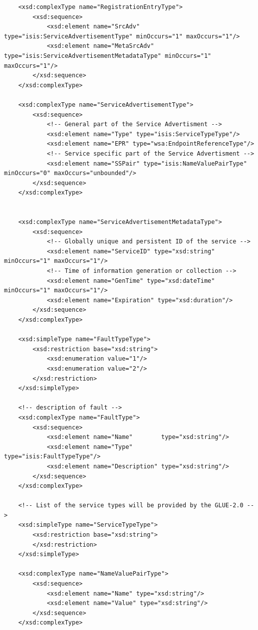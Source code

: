 \documentclass{book}
\begin{document}
\begin{verbatim}
    <xsd:complexType name="RegistrationEntryType">
        <xsd:sequence>
            <xsd:element name="SrcAdv" type="isis:ServiceAdvertisementType" minOccurs="1" maxOccurs="1"/>
            <xsd:element name="MetaSrcAdv" type="isis:ServiceAdvertisementMetadataType" minOccurs="1" maxOccurs="1"/>
        </xsd:sequence>
    </xsd:complexType>

    <xsd:complexType name="ServiceAdvertisementType">
        <xsd:sequence>
            <!-- General part of the Service Advertisment -->
            <xsd:element name="Type" type="isis:ServiceTypeType"/>
            <xsd:element name="EPR" type="wsa:EndpointReferenceType"/>
            <!-- Service specific part of the Service Advertisment -->
            <xsd:element name="SSPair" type="isis:NameValuePairType" minOccurs="0" maxOccurs="unbounded"/>
        </xsd:sequence>
    </xsd:complexType>


    <xsd:complexType name="ServiceAdvertisementMetadataType">
        <xsd:sequence>
            <!-- Globally unique and persistent ID of the service -->
            <xsd:element name="ServiceID" type="xsd:string" minOccurs="1" maxOccurs="1"/>
            <!-- Time of information generation or collection -->
            <xsd:element name="GenTime" type="xsd:dateTime" minOccurs="1" maxOccurs="1"/>
            <xsd:element name="Expiration" type="xsd:duration"/>
        </xsd:sequence>
    </xsd:complexType>

    <xsd:simpleType name="FaultTypeType">
        <xsd:restriction base="xsd:string">
            <xsd:enumeration value="1"/>
            <xsd:enumeration value="2"/>
        </xsd:restriction>
    </xsd:simpleType>

    <!-- description of fault -->
    <xsd:complexType name="FaultType">
        <xsd:sequence>
            <xsd:element name="Name"        type="xsd:string"/>
            <xsd:element name="Type"        type="isis:FaultTypeType"/>
            <xsd:element name="Description" type="xsd:string"/>
        </xsd:sequence>
    </xsd:complexType>

    <!-- List of the service types will be provided by the GLUE-2.0 -->
    <xsd:simpleType name="ServiceTypeType">
        <xsd:restriction base="xsd:string">
        </xsd:restriction>
    </xsd:simpleType>

    <xsd:complexType name="NameValuePairType">
        <xsd:sequence>
            <xsd:element name="Name" type="xsd:string"/>
            <xsd:element name="Value" type="xsd:string"/>
        </xsd:sequence>
    </xsd:complexType>


\end{verbatim}
\end{document}
